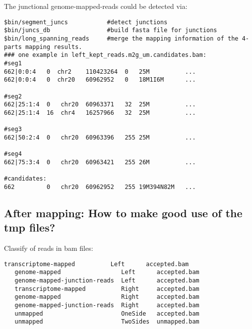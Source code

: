 \begin{frame}[c,fragile]
	\begin{block}{ The \alert{junctional genome-mapped-reads} could be detected via: }
		\begin{lstlisting}[basicstyle=\tiny]
$bin/segment_juncs           #detect junctions
$bin/juncs_db                #build fasta file for junctions
$bin/long_spanning_reads     #merge the mapping information of the 4-parts mapping results.
### one example in left_kept_reads.m2g_um.candidates.bam:
#seg1
662|0:0:4   0  chr2    110423264  0   25M          ...
662|0:0:4   0  chr20   60962952   0   18M1I6M      ...

#seg2
662|25:1:4  0   chr20  60963371   32  25M          ...
662|25:1:4  16  chr4   16257966   32  25M          ...

#seg3
662|50:2:4  0   chr20  60963396   255 25M          ...

#seg4
662|75:3:4  0   chr20  60963421   255 26M          ...

#candidates:
662         0   chr20  60962952   255 19M394N82M   ...
		\end{lstlisting}
	\end{block}
\end{frame}


\subsection{ After mapping: How to make good use of the tmp files? } 
\begin{frame}[c,fragile]
	\begin{block}{ Classify of reads in bam files: }
		\begin{lstlisting}[basicstyle=\tiny]
   transcriptome-mapped          Left      accepted.bam
   genome-mapped                 Left      accepted.bam
   genome-mapped-junction-reads  Left      accepted.bam
   transcriptome-mapped          Right     accepted.bam
   genome-mapped                 Right     accepted.bam
   genome-mapped-junction-reads  Right     accepted.bam
   unmapped                      OneSide   accepted.bam
   unmapped                      TwoSides  unmapped.bam
		\end{lstlisting}
	\end{block}
\end{frame}

